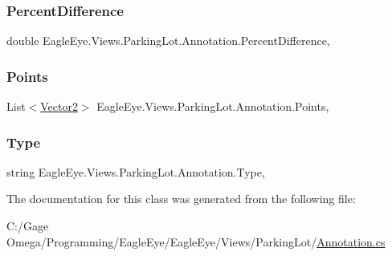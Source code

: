 \subsubsection{\texorpdfstring{PercentDifference}{PercentDifference}}
{\footnotesize\ttfamily double Eagle\+Eye.\+Views.\+Parking\+Lot.\+Annotation.\+Percent\+Difference\hspace{0.3cm}{\ttfamily [get]}, {\ttfamily [set]}}

\mbox{\label{class_eagle_eye_1_1_views_1_1_parking_lot_1_1_annotation_a7f931393cb52e90a6eca3ceb7ba8dad9}} 
\subsubsection{\texorpdfstring{Points}{Points}}
{\footnotesize\ttfamily List$<$\mbox{\hyperlink{class_eagle_eye_1_1_views_1_1_parking_lot_1_1_vector2}{Vector2}}$>$ Eagle\+Eye.\+Views.\+Parking\+Lot.\+Annotation.\+Points\hspace{0.3cm}{\ttfamily [get]}, {\ttfamily [set]}}

\mbox{\label{class_eagle_eye_1_1_views_1_1_parking_lot_1_1_annotation_a90963e9e05db4da561e03dcea8cf1c8e}} 
\subsubsection{\texorpdfstring{Type}{Type}}
{\footnotesize\ttfamily string Eagle\+Eye.\+Views.\+Parking\+Lot.\+Annotation.\+Type\hspace{0.3cm}{\ttfamily [get]}, {\ttfamily [set]}}



The documentation for this class was generated from the following file\+:\begin{DoxyCompactItemize}
\item 
C\+:/\+Gage Omega/\+Programming/\+Eagle\+Eye/\+Eagle\+Eye/\+Views/\+Parking\+Lot/\mbox{\hyperlink{_views_2_parking_lot_2_annotation_8cs}{Annotation.\+cs}}\end{DoxyCompactItemize}

